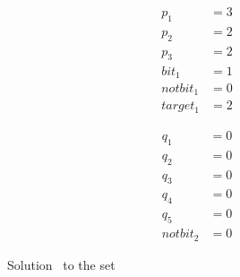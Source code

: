 \begin{figure}
  \begin{minipage}{.49\columnwidth}
    \begin{align*}
      p_1      & = 3 \\[-0.4em]
      p_2      & = 2 \\[-0.4em]
      p_3      & = 2 \\[-0.4em]
      bit_1    & = 1 \\[-0.4em]
      notbit_1 & = 0 \\[-0.4em]
      target_1 & = 2
    \end{align*}
  \end{minipage}
  \begin{minipage}{.49\columnwidth}
    \begin{align*}
      q_1      & = 0 \\[-0.4em]
      q_2      & = 0 \\[-0.4em]
      q_3      & = 0 \\[-0.4em]
      q_4      & = 0 \\[-0.4em]
      q_5      & = 0 \\[-0.4em]
      notbit_2 & = 0
    \end{align*}
  \end{minipage}
  \caption{Solution \solAp\ to the set \setCp\ }
  \label{fig_solAp}
\end{figure}
